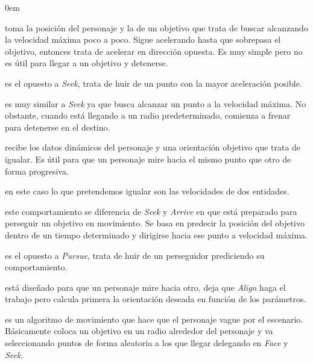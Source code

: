 \begin{description}
    \itemsep0em
    \item [Seek] toma la posición del personaje y la de un objetivo que trata
    de buscar alcanzando la velocidad máxima poco a poco. Sigue acelerando
    hasta que sobrepasa el objetivo, entonces trata de acelerar en dirección
    opuesta. Es muy simple pero no es útil para llegar a un objetivo y detenerse.
    
    \item [Flee] es el opuesto a \textit{Seek}, trata de huir de un punto
    con la mayor aceleración posible.
    
    \item [Arrive] es muy similar a \textit{Seek} ya que busca alcanzar un
    punto a la velocidad máxima. No obstante, cuando está llegando a un radio
    predeterminado, comienza a frenar para detenerse en el destino.
    
    \item [Align] recibe los datos dinámicos del personaje y una orientación
    objetivo que trata de igualar. Es útil para que un personaje mire hacia
    el mismo punto que otro de forma progresiva.
    
    \item [VelocityMatch] en este caso lo que pretendemos igualar son las velocidades
    de dos entidades.
    
    \item [Pursue] este comportamiento se diferencia de \textit{Seek} y \textit{Arrive}
    en que está preparado para perseguir un objetivo en movimiento. Se basa
    en predecir la posición del objetivo dentro de un tiempo determinado y dirigirse
    hacia ese punto a velocidad máxima.
    
    \item [Evade] es el opuesto a \textit{Pursue}, trata de huir de un perseguidor
    prediciendo su comportamiento.
    
    \item [Face] está diseñado para que un personaje mire hacia otro, deja
    que \textit{Align} haga el trabajo pero calcula primera la orientación
    deseada en función de los parámetros.
    
    \item [Wander] es un algoritmo de movimiento que hace que el personaje
    vague por el escenario. Básicamente coloca un objetivo en un radio
    alrededor del personaje y va seleccionando puntos de forma aleatoria
    a los que llegar delegando en \textit{Face} y \textit{Seek}.
    

\end{description}

